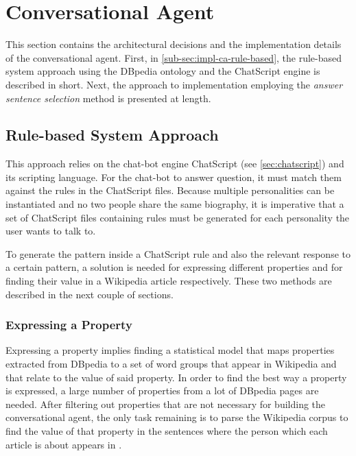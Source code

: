 \section{Conversational Agent}
\label{sec:impl-conversational-agent}

This section contains the architectural decisions and the implementation details of the conversational agent. First, in \autoref{sub-sec:impl-ca-rule-based}, the  rule-based system approach using the DBpedia ontology and the ChatScript engine is described in short. Next, the approach to implementation employing the {\em answer sentence selection} method is presented at length.

\subsection{Rule-based System Approach}
\label{sub-sec:impl-ca-rule-based}

This approach relies on the chat-bot engine ChatScript (see \autoref{sec:chatscript}) and its scripting language. For the chat-bot to answer question, it must match them against the rules in the ChatScript files. Because multiple personalities can be instantiated and no two people share the same biography, it is imperative that a set of ChatScript files containing rules must be generated for each personality the user wants to talk to.

To generate the pattern inside a ChatScript rule and also the relevant response to a certain pattern, a solution is needed for expressing different properties and for finding their value in a Wikipedia article respectively. These two methods are described in the next couple of sections.

\subsubsection{Expressing a Property}

Expressing a property implies finding a statistical model that maps properties extracted from DBpedia to a set of word groups that appear in Wikipedia and that relate to the value of said property. In order to find the best way a property is expressed, a large number of properties from a lot of DBpedia pages are needed. After filtering out properties that are not necessary for building the conversational agent, the only task remaining is to parse the Wikipedia corpus to find the value of that property in the sentences where the person which each article is about appears in \cite{Bogatu}.

